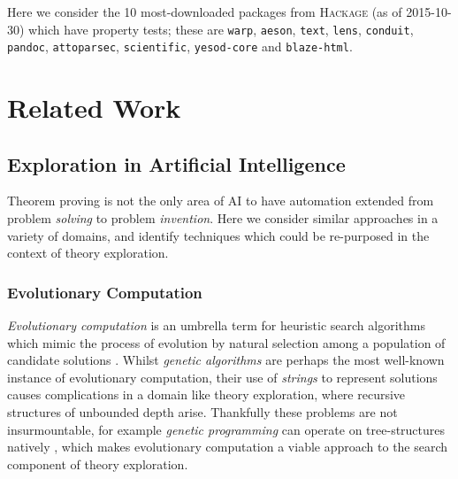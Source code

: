 \documentclass[]{article}
\begin{document}
Here we consider the 10 most-downloaded packages from \textsc{Hackage} (as of 2015-10-30) which have property tests; these are \texttt{warp}, \texttt{aeson}, \texttt{text}, \texttt{lens}, \texttt{conduit}, \texttt{pandoc}, \texttt{attoparsec}, \texttt{scientific}, \texttt{yesod-core} and \texttt{blaze-html}.


\section{Related Work}
\label{related}

\iffalse

\subsection{Conjecture Generation}

The task of \emph{conjecture generation} lies at the heart of theory exploration, and

\subsubsection{Lemma generation}

\fi

\subsection{Exploration in Artificial Intelligence}

Theorem proving is not the only area of AI to have automation extended from problem \emph{solving} to problem \emph{invention}. Here we consider similar approaches in a variety of domains, and identify techniques which could be re-purposed in the context of theory exploration.

\subsubsection{Evolutionary Computation}

\emph{Evolutionary computation} is an umbrella term for heuristic search algorithms which mimic the process of evolution by natural selection among a population of candidate solutions \cite{back1997evolutionary}. Whilst \emph{genetic algorithms} are perhaps the most well-known instance of evolutionary computation, their use of \emph{strings} to represent solutions causes complications in a domain like theory exploration, where recursive structures of unbounded depth arise. Thankfully these problems are not insurmountable, for example \emph{genetic programming} can operate on tree-structures natively \cite{banzhaf1998genetic}, which makes evolutionary computation a viable approach to the search component of theory exploration.
\end{document}
